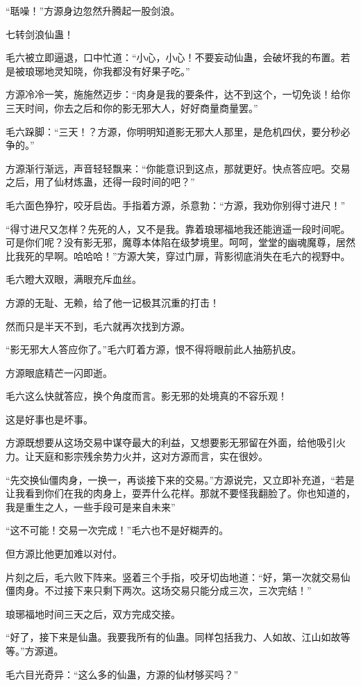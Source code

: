 \begin{this_body}
“聒噪！”方源身边忽然升腾起一股剑浪。

七转剑浪仙蛊！

毛六被立即逼退，口中忙道：“小心，小心！不要妄动仙蛊，会破坏我的布置。若是被琅琊地灵知晓，你我都没有好果子吃。”

方源冷冷一笑，施施然迈步：“肉身是我的要条件，达不到这个，一切免谈！给你三天时间，你去之后和你的影无邪大人，好好商量商量罢。”

毛六跺脚：“三天！？方源，你明明知道影无邪大人那里，是危机四伏，要分秒必争的。”

方源渐行渐远，声音轻轻飘来：“你能意识到这点，那就更好。快点答应吧。交易之后，用了仙材炼蛊，还得一段时间的吧？”

毛六面色狰狞，咬牙启齿。手指着方源，杀意勃：“方源，我劝你别得寸进尺！”

“得寸进尺又怎样？先死的人，又不是我。靠着琅琊福地我还能逍遥一段时间呢。可是你们呢？没有影无邪，魔尊本体陷在级梦境里。呵呵，堂堂的幽魂魔尊，居然比我死的早啊。哈哈哈！”方源大笑，穿过门扉，背影彻底消失在毛六的视野中。

毛六瞪大双眼，满眼充斥血丝。

方源的无耻、无赖，给了他一记极其沉重的打击！

然而只是半天不到，毛六就再次找到方源。

“影无邪大人答应你了。”毛六盯着方源，恨不得将眼前此人抽筋扒皮。

方源眼底精芒一闪即逝。

毛六这么快就答应，换个角度而言。影无邪的处境真的不容乐观！

这是好事也是坏事。

方源既想要从这场交易中谋夺最大的利益，又想要影无邪留在外面，给他吸引火力。让天庭和影宗残余势力火并，这对方源而言，实在很妙。

“先交换仙僵肉身，一换一，再谈接下来的交易。”方源说完，又立即补充道，“若是让我看到你们在我的肉身上，耍弄什么花样。那就不要怪我翻脸了。你也知道的，我是重生之人，一些手段可是来自未来”

“这不可能！交易一次完成！”毛六也不是好糊弄的。

但方源比他更加难以对付。

片刻之后，毛六败下阵来。竖着三个手指，咬牙切齿地道：“好，第一次就交易仙僵肉身。不过接下来只剩下两次。这场交易只能分成三次，三次完结！”

琅琊福地时间三天之后，双方完成交接。

“好了，接下来是仙蛊。我要我所有的仙蛊。同样包括我力、人如故、江山如故等等。”方源道。

毛六目光奇异：“这么多的仙蛊，方源的仙材够买吗？”


\end{this_body}
